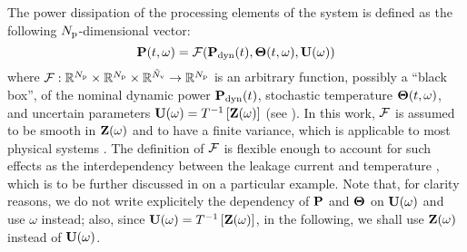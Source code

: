 The power dissipation of the processing elements of the system is defined as the following ${N_\text{p}}$-dimensional vector:
\begin{equation} \elabel{power-model}
  \vP(\t, \o) = \f(\vP_\dyn(\t), \vTO(\t, \o), \vU(\o))
\end{equation}
where $\mathcal{F}: \mathbb{R}^{N_\text{p}} \times \mathbb{R}^{N_\text{p}} \times \mathbb{R}^{\tilde{N}_\text{v}} \to \mathbb{R}^{N_\text{p}}$ is an arbitrary function, possibly a ``black box'', of the nominal dynamic power $\mathbf{P}_{\text{dyn}}(t)$, stochastic temperature ${\boldsymbol\Theta}(t, \omega)$, and uncertain parameters $\mathbf{U}(\omega) = T^{-1}\left[\mathbf{Z}(\omega)\right]$ (see ). In this work, $\mathcal{F}$ is assumed to be smooth in $\mathbf{Z}(\omega)$ and to have a finite variance, which is applicable to most physical systems \cite{xiu2002}. The definition of $\mathcal{F}$ is flexible enough to account for such effects as the interdependency between the leakage current and temperature \cite{srivastava2010, liu2007}, which is to be further discussed in  on a particular example. Note that, for clarity reasons, we do not write explicitely the dependency of $\mathbf{P}$ and ${\boldsymbol\Theta}$ on $\mathbf{U}(\omega)$ and use $\omega$ instead; also, since $\mathbf{U}(\omega) = T^{-1}\left[\mathbf{Z}(\omega)\right]$, in the following, we shall use $\mathbf{Z}(\omega)$ instead of $\mathbf{U}(\omega)$.
